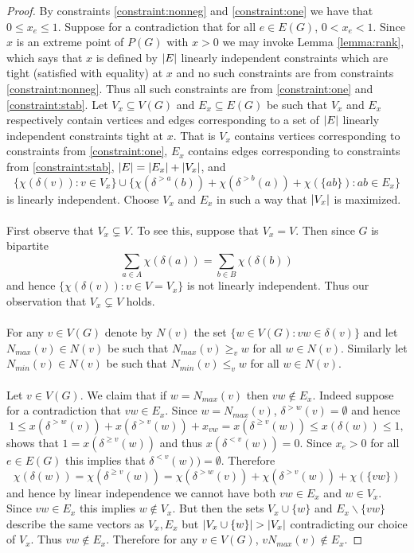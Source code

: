\begin{proof}
By constraints \ref{constraint:nonneg} and \ref{constraint:one} we have that $0 \leq x_e \leq 1$. Suppose for a contradiction that for all $e \in E(G)$, $0 <x_e < 1$. Since $x$ is an extreme point of $P(G)$ with $x>0$ we may invoke Lemma \ref{lemma:rank}, which says that $x$ is defined by $\left|E\right|$ linearly independent constraints which are tight (satisfied with equality) at $x$ and no such constraints are from constraints \ref{constraint:nonneg}. Thus all such constraints are from \ref{constraint:one} and \ref{constraint:stab}. Let $V_x \subseteq V(G)$ and $E_x \subseteq E(G)$ be such that $V_x$ and $E_x$ respectively contain vertices and edges corresponding to a set of $\left|E\right|$ linearly independent constraints tight at $x$. That is $V_x$ contains vertices corresponding to constraints from \ref{constraint:one}, $E_x$ contains edges corresponding to constraints from \ref{constraint:stab}, $\left|E\right| = \left|E_x\right| + \left|V_x\right|$, and $$\{\chi(\delta(v)) : v \in V_x\} \cup \{\chi(\delta^{>a}(b)) + \chi(\delta^{>b}(a)) + \chi(\{ab\}): ab \in E_x\}$$ is linearly independent. Choose $V_x$ and $E_x$ in such a way that $\left|V_x\right|$ is maximized.
\paragraph{}
First observe that $V_x \subsetneq V$. To see this, suppose that $V_x = V$. Then since $G$ is bipartite
$$\sum_{a \in A} \chi(\delta(a)) = \sum_{b \in B} \chi(\delta(b))$$
and hence $\{\chi(\delta(v)) : v \in V=V_x\}$ is not linearly independent. Thus our observation that $V_x \subsetneq V$ holds.
\paragraph{}
For any $v \in V(G)$ denote by $N(v)$ the set $\{ w \in V(G): vw \in \delta(v)\}$ and let $N_{max}(v) \in N(v)$ be such that $N_{max}(v) \geq_v w$ for all $w \in N(v)$. Similarly let $N_{min}(v) \in N(v)$ be such that $N_{min}(v) \leq_v w$ for all $w \in N(v)$.
\paragraph{}
Let $v \in V(G)$. We claim that if $w = N_{max}(v)$ then $vw \not\in E_x$. Indeed suppose for a contradiction that $vw \in E_x$. Since $w = N_{max}(v)$, $\delta^{>w}(v) = \emptyset$ and hence
$$1 \leq x(\delta^{>w}(v)) + x(\delta^{>v}(w)) + x_{vw}  = x(\delta^{\geq v}(w)) \leq x(\delta(w)) \leq 1,$$
shows that $1 = x(\delta^{\geq v}(w))$ and thus $x(\delta^{<v}(w))= 0$. Since $x_e > 0$ for all $e \in E(G)$ this implies that $\delta^{<v}(w)) = \emptyset$. Therefore
$$\chi(\delta(w)) = \chi(\delta^{\geq v}(w)) = \chi(\delta^{>w}(v)) + \chi(\delta^{>v}(w)) + \chi(\{vw\})$$
and hence by linear independence we cannot have both $vw \in E_x$ and $w \in V_x$. Since $vw \in E_x$ this implies $w \not\in V_x$. But then the sets $V_x \cup\{w\}$ and $E_x \backslash\{vw\}$ describe the same vectors as $V_x, E_x$ but $\left|V_x \cup\{w\}\right| > \left|V_x\right|$ contradicting our choice of $V_x$. Thus $vw \not\in E_x$. Therefore for any $v \in V(G)$, $vN_{max}(v) \not\in E_x$.

\end{proof}
